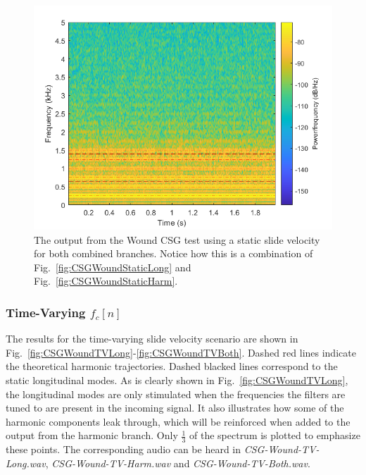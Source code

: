 \documentclass[../main.tex]{subfiles}
\begin{document}
\begin{figure}[h!]
    \centering
    \includegraphics[scale=.60]{./images/plots/CSG_Wound_Static_Both.png}
    \caption{The output from the Wound CSG test using a static slide velocity for both combined branches. Notice how this is a combination of Fig.~\ref{fig:CSGWoundStaticLong} and Fig.~\ref{fig:CSGWoundStaticHarm}.}
    \label{fig:CSGWoundStaticBoth}
\end{figure}

\subsubsection{Time-Varying $f_c[n]$}
The results for the time-varying slide velocity scenario are shown in Fig.~\ref{fig:CSGWoundTVLong}-\ref{fig:CSGWoundTVBoth}. Dashed red lines indicate the theoretical harmonic trajectories. Dashed blacked lines correspond to the static longitudinal modes. As is clearly shown in Fig.~\ref{fig:CSGWoundTVLong}, the longitudinal modes are only stimulated when the frequencies the filters are tuned to are present in the incoming signal. It also illustrates how some of the harmonic components leak through, which will be reinforced when added to the output from the harmonic branch. Only $\frac{1}{3}$ of the spectrum is plotted to emphasize these points. The corresponding audio can be heard in \emph{CSG-Wound-TV-Long.wav}, \emph{CSG-Wound-TV-Harm.wav} and \emph{CSG-Wound-TV-Both.wav}.
\end{document}
